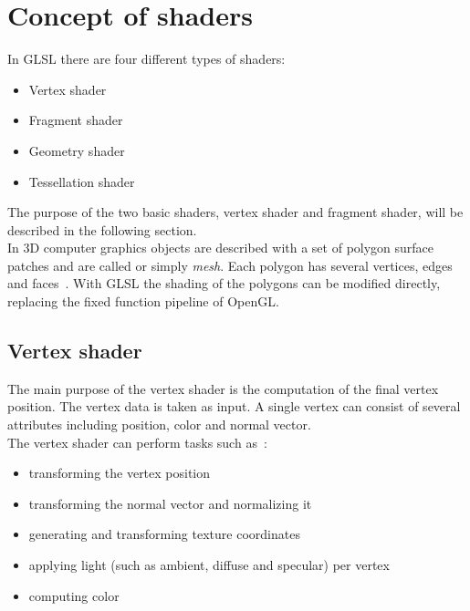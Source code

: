 \section{Concept of shaders}

In GLSL there are four different types of shaders:
\begin{itemize}
	\item Vertex shader
	\item Fragment shader
	\item Geometry shader
	\item Tessellation shader
\end{itemize}

The purpose of the two basic shaders, vertex shader and fragment shader, will be described in the following section.\\
\newline
In 3D computer graphics objects are described with a set of polygon surface patches and are called  or simply \emph{mesh}. Each polygon has several vertices, edges and faces~\cite{book:computerGraphicsHearn}. With GLSL the shading of the polygons can be modified directly, replacing the fixed function pipeline of OpenGL.

\subsection{Vertex shader}
The main purpose of the vertex shader is the computation of the final vertex position. The vertex data is taken as input. A single vertex can consist of several attributes including position, color and normal vector.\\
The vertex shader can perform tasks such as~\cite{book:computerGraphicsHill}: %
\begin{itemize}
	\item transforming the vertex position
	\item transforming the normal vector and normalizing it
	\item generating and transforming texture coordinates
	\item applying light (such as ambient, diffuse and specular) per vertex
	\item computing color
\end{itemize}

